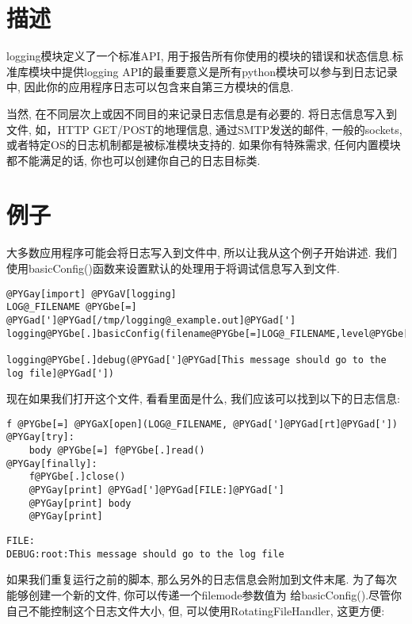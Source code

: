 \documentclass[a4paper,10pt,english]{manual}
\begin{document}
\section{描述}

logging模块定义了一个标准API, 用于报告所有你使用的模块的错误和状态信息.标准库模块中提供logging API的最重要意义是所有python模块可以参与到日志记录中, 因此你的应用程序日志可以包含来自第三方模块的信息.

当然, 在不同层次上或因不同目的来记录日志信息是有必要的. 将日志信息写入到文件, 如，HTTP GET/POST的地理信息, 通过SMTP发送的邮件, 一般的sockets, 或者特定OS的日志机制都是被标准模块支持的. 如果你有特殊需求, 任何内置模块都不能满足的话, 你也可以创建你自己的日志目标类.


\section{例子}

大多数应用程序可能会将日志写入到文件中, 所以让我从这个例子开始讲述. 我们使用basicConfig()函数来设置默认的处理用于将调试信息写入到文件.

\begin{Verbatim}[commandchars=@\[\]]
@PYGay[import] @PYGaV[logging]
LOG@_FILENAME @PYGbe[=] @PYGad[']@PYGad[/tmp/logging@_example.out]@PYGad[']
logging@PYGbe[.]basicConfig(filename@PYGbe[=]LOG@_FILENAME,level@PYGbe[=]logging@PYGbe[.]DEBUG,)

logging@PYGbe[.]debug(@PYGad[']@PYGad[This message should go to the log file]@PYGad['])
\end{Verbatim}

现在如果我们打开这个文件, 看看里面是什么, 我们应该可以找到以下的日志信息:

\begin{Verbatim}[commandchars=@\[\]]
f @PYGbe[=] @PYGaX[open](LOG@_FILENAME, @PYGad[']@PYGad[rt]@PYGad['])
@PYGay[try]:
    body @PYGbe[=] f@PYGbe[.]read()
@PYGay[finally]:
    f@PYGbe[.]close()
    @PYGay[print] @PYGad[']@PYGad[FILE:]@PYGad[']
    @PYGay[print] body
    @PYGay[print]
\end{Verbatim}

\begin{Verbatim}[commandchars=@\[\]]
FILE:
DEBUG:root:This message should go to the log file
\end{Verbatim}

如果我们重复运行之前的脚本, 那么另外的日志信息会附加到文件末尾. 为了每次能够创建一个新的文件, 你可以传递一个filemode参数值为  给basicConfig().尽管你自己不能控制这个日志文件大小, 但, 可以使用RotatingFileHandler, 这更方便:
\end{document}
